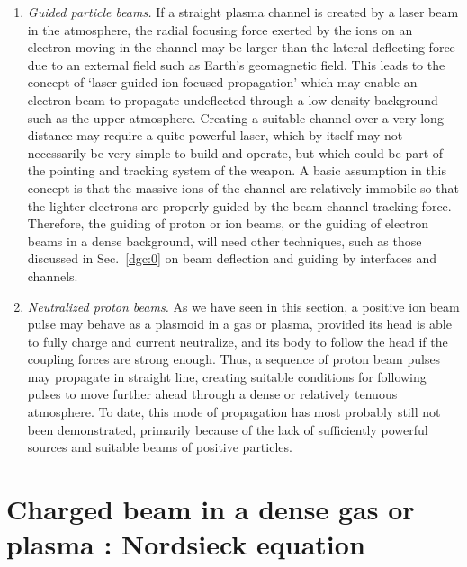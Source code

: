 \documentclass [12pt,a4paper,     ]{report} %
\begin{document}
\begin{enumerate}
\item \emph{Guided particle beams.} If a straight plasma channel is created by a laser beam in the atmosphere, the radial focusing force exerted by the ions on an electron moving in the channel may be larger than the lateral deflecting force due to an external field such as Earth's geomagnetic field.  This leads to the concept of `laser-guided ion-focused propagation' which may enable an electron beam to propagate undeflected through a low-density background such as the upper-atmosphere.  Creating a suitable channel over a very long distance may require a quite powerful laser, which by itself may not necessarily be very simple to build and operate, but which could be part of the pointing and tracking system of the weapon.  A basic assumption in this concept is that the massive ions of the channel are relatively immobile so that the lighter electrons are properly guided by the beam-channel tracking force.  Therefore, the guiding of proton or ion beams, or the guiding of electron beams in a dense background, will need other techniques, such as those discussed in Sec.~\ref{dgc:0} on beam deflection and guiding by interfaces and channels.

\item \emph{Neutralized proton beams.}  As we have seen in this section, a positive ion beam pulse may behave as a plasmoid in a gas or plasma, provided its head is able to fully charge and current neutralize, and its body to follow the head if the coupling forces are strong enough.  Thus, a sequence of proton beam pulses may propagate in straight line, creating suitable conditions for following pulses to move further ahead through a dense or relatively tenuous atmosphere.  To date, this mode of propagation has most probably still not been demonstrated, primarily because of the lack of sufficiently powerful sources and  suitable beams of positive particles. 

\end{enumerate} 




\section{Charged beam in a dense gas or plasma : Nordsieck equation}
\label{nor:0}
\end{document}
